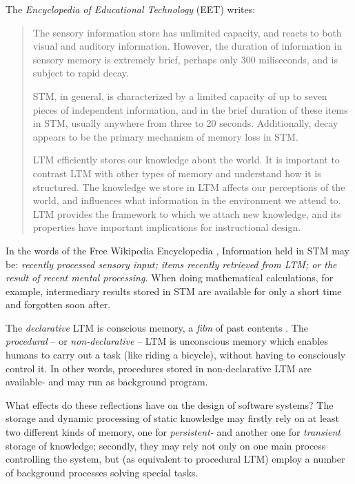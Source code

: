 The \emph{Encyclopedia of Educational Technology} (EET) \cite{eet} writes:

\begin{quote}
    The sensory information store has unlimited capacity, and reacts to both
    visual and auditory information. However, the duration of information in
    sensory memory is extremely brief, perhaps only 300 miliseconds, and is
    subject to rapid decay.

    STM, in general, is characterized by a limited capacity of up to seven
    pieces of independent information, and in the brief duration of these items
    in STM, usually anywhere from three to 20 seconds. Additionally, decay
    appears to be the primary mechanism of memory loss in STM.

    LTM efficiently stores our knowledge about the world. It is important to
    contrast LTM with other types of memory and understand how it is
    structured. The knowledge we store in LTM affects our perceptions of the
    world, and influences what information in the environment we attend to. LTM
    provides the framework to which we attach new knowledge, and its properties
    have important implications for instructional design.
\end{quote}

In the words of the Free Wikipedia Encyclopedia \cite{wikipedia}, Information
held in STM may be: \textit{recently processed sensory input; items recently
retrieved from LTM; or the result of recent mental processing.} When doing
mathematical calculations, for example, intermediary results stored in STM are
available for only a short time and forgotten soon after.

The \emph{declarative} LTM is conscious memory, a \emph{film} of past contents
\cite{fernandez}. The \emph{procedural} -- or \emph{non-declarative} -- LTM is
unconscious memory which enables humans to carry out a task (like riding a
bicycle), without having to consciously control it. In other words, procedures
stored in non-declarative LTM are available- and may run as background program.

What effects do these reflections have on the design of software systems? The
storage and dynamic processing of static knowledge may firstly rely on at least
two different kinds of memory, one for \emph{persistent-} and another one for
\emph{transient} storage of knowledge; secondly, they may rely not only on one
main process controlling the system, but (as equivalent to procedural LTM)
employ a number of background processes solving special tasks.
